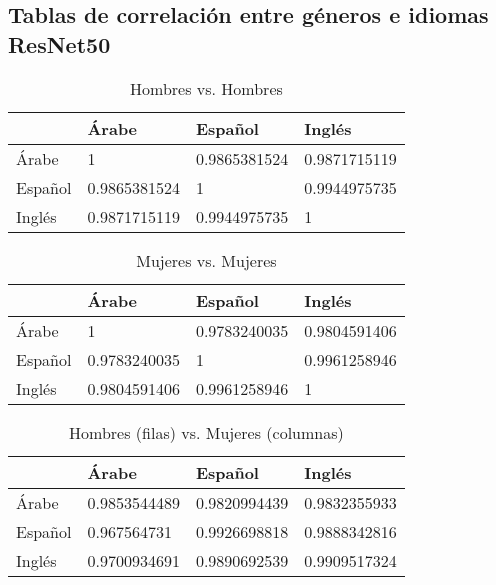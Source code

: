 \subsection{Tablas de correlación entre géneros e idiomas ResNet50}

\begin{table}[!h]
\centering
\caption{Hombres vs. Hombres}
\label{male-vs-male-correlation-resnet}
\begin{tabular}{|l|l|l|l|}
\hline
      & Árabe & Español & Inglés \\ \hline
Árabe & 1 & 0.9865381524 & 0.9871715119 \\ \hline
Español & 0.9865381524 & 1 & 0.9944975735 \\ \hline
Inglés & 0.9871715119 & 0.9944975735 &	1 \\ \hline
\end{tabular}
\end{table}


\begin{table}[!h]
\centering
\caption{Mujeres vs. Mujeres}
\label{female-vs-female-correlation-resnet}
\begin{tabular}{|l|l|l|l|}
\hline
& Árabe & Español & Inglés \\ \hline
Árabe & 1 & 0.9783240035 & 0.9804591406 \\ \hline
Español & 0.9783240035 & 1 & 0.9961258946 \\ \hline
Inglés & 0.9804591406 & 0.9961258946 & 1 \\ \hline
\end{tabular}
\end{table}



\begin{table}[!h]

\centering
\caption{Hombres (filas) vs. Mujeres (columnas)}
\label{female-vs-male-correlation-resnet}
\begin{tabular}{|l|l|l|l|}
\hline
 & Árabe & Español & Inglés \\ \hline
Árabe & 0.9853544489 & 0.9820994439 & 0.9832355933 \\ \hline
Español & 0.967564731 & 0.9926698818 & 0.9888342816 \\ \hline
Inglés & 0.9700934691 & 0.9890692539 & 0.9909517324 \\ \hline

\end{tabular}
\end{table}


